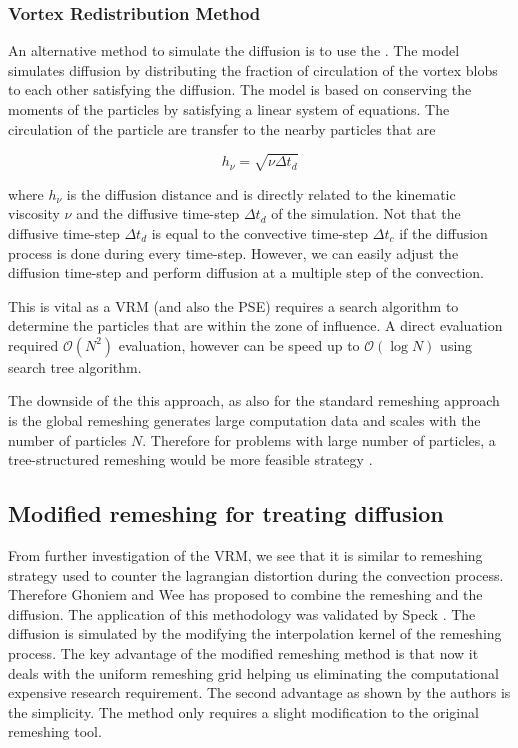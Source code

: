 \subsubsection*{Vortex Redistribution Method}
An alternative method to simulate the diffusion is to use the  \cite{Shankar1996}. The model simulates diffusion by distributing the fraction of circulation of the vortex blobs to each other satisfying the diffusion. The model is based on conserving the moments of the particles by satisfying a linear system of equations. The circulation of the particle are transfer to the nearby particles that are 

	\begin{equation}
	h_{\nu} = \sqrt{\nu\Delta t_d}
	\end{equation}

where $h_{\nu}$ is the diffusion distance and is directly related to the kinematic viscosity $\nu$ and the diffusive time-step $\Delta t_d$ of the simulation. Not that the diffusive time-step $\Delta t_d$ is equal to the convective time-step $\Delta t_c$ if the diffusion process is done during every time-step. However, we can easily adjust the diffusion time-step and perform diffusion at a multiple step of the convection.

This is vital as a VRM (and also the PSE) requires a search algorithm to determine the particles that are within the zone of influence. A direct evaluation required $\mathcal{O}\left(N^2\right)$ evaluation, however can be speed up to $\mathcal{O}\left(\log N\right)$ using search tree algorithm.

The downside of the this approach, as also for the standard remeshing approach is the global remeshing generates large computation data and scales with the number of particles $N$. Therefore for problems with large number of particles, a tree-structured remeshing would be more feasible strategy \cite{Winckelmans1996}.

\subsection{Modified remeshing for treating diffusion}
From further investigation of the VRM, we see that it is similar to remeshing strategy used to counter the lagrangian distortion during the convection process. Therefore Ghoniem and Wee \cite{Wee2006} has proposed to combine the remeshing and the diffusion. The application of this methodology was validated by Speck \cite{Speck2011a}. The diffusion is simulated by the modifying the interpolation kernel of the remeshing process. The key advantage of the modified remeshing method is that now it deals with the uniform remeshing grid helping us eliminating the computational expensive research requirement. The second advantage as shown by the authors is the simplicity. The method only requires a slight modification to the original remeshing tool.

